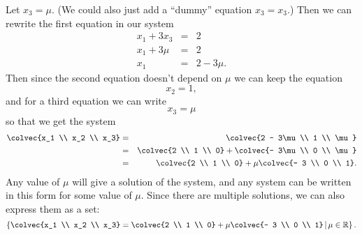 {Let $x_3 = \mu$. (We could also just add a ``dummy'' equation $x_3=x_3$.) Then we can rewrite the first equation in our system
\begin{eqnarray*}
 x_1+ 3x_3 &=& 2\\
x_1+ 3\mu &=& 2\\
x_1 &=& 2 -3\mu.
\end{eqnarray*}
Then since the second equation doesn't depend on $\mu$ we can keep the equation 
\[  x_2 = 1, \]
and for a third equation we can write
\[x_3 = \mu \]
so that we get the system
\begin{eqnarray*}
  \colvec{x_1 \\ x_2 \\ x_3} &=& \colvec{2 - 3\mu \\ 1 \\ \mu}\\
	&=&  \colvec{2 \\ 1 \\ 0} +  \colvec{- 3\mu \\ 0 \\ \mu} \\
	&=& \colvec{2 \\ 1 \\ 0} +  \mu \colvec{- 3 \\ 0 \\ 1}.
\end{eqnarray*}
Any value of $\mu$ will give a solution of the system, and any system can be written in this form for some value of $\mu$. Since there are multiple solutions, we can also express them as a set:
\[
\left\{ \colvec{x_1 \\ x_2 \\ x_3} = \colvec{2 \\ 1 \\ 0} + \mu \colvec{- 3 \\ 0 \\ 1}
\; \vline \; \mu \in \mathbb{R} \right\}.
\]

}

